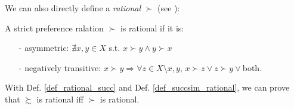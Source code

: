We can also directly define a \textit{rational} $\succ$ (see \citet[Page 19-21]{kreps1990acourse}):
\begin{definition}\label{def_rational_succ}
    A strict preference ralation $\succ$ is rational if it is:
    \begin{enumerate}
        \item[-] asymmetric: $\nexists x,y\in X$ s.t. $x\succ y \land y\succ x$
        \item[-] negatively transitive: $x\succ y \Rightarrow \forall z\in X\setminus{x,y}$, $x\succ z\lor z\succ y \lor$both. 
    \end{enumerate}
\end{definition}

With Def. \ref{def_rational_succ} and Def. \ref{def_succsim_rational}, we can prove that $\succsim$ is rational iff $\succ$ is rational.